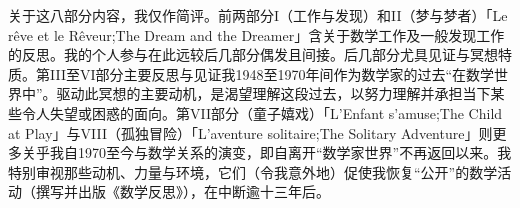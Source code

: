 关于这八部分内容，我仅作简评。前两部分I（工作与发现）和II（梦与梦者）「Le rêve et le Rêveur;The Dream and the Dreamer」含关于数学工作及一般发现工作的反思。我的个人参与在此远较后几部分偶发且间接。后几部分尤具见证与冥想特质。第III至VI部分主要反思与见证我1948至1970年间作为数学家的过去“在数学世界中”。驱动此冥想的主要动机，是渴望理解这段过去，以努力理解并承担当下某些令人失望或困惑的面向。第VII部分（童子嬉戏）「L'Enfant s'amuse;The Child at Play」与VIII（孤独冒险）「L'aventure solitaire;The Solitary Adventure」则更多关乎我自1970至今与数学关系的演变，即自离开“数学家世界”不再返回以来。我特别审视那些动机、力量与环境，它们（令我意外地）促使我恢复“公开”的数学活动（撰写并出版《数学反思》），在中断逾十三年后。